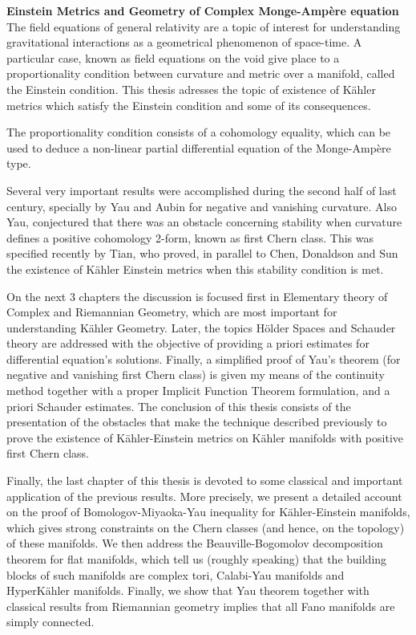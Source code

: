 \textbf{Einstein Metrics and Geometry of Complex Monge-Amp\`ere equation}\\


The field equations of general relativity are a topic of interest for understanding gravitational interactions as a geometrical phenomenon of space-time. A particular case, known as field equations on the void give place to a proportionality condition between curvature and metric over a manifold, called the Einstein condition. This thesis adresses the topic of existence of K\"ahler metrics which satisfy the Einstein condition and some of its consequences.

\vspace{2mm}

The proportionality condition consists of a cohomology equality, which can be used to deduce a
non-linear partial differential equation of the Monge-Amp\`ere type.

\vspace{2mm}

Several very important results were accomplished during the second half of last century, specially
by Yau and Aubin for negative and vanishing curvature. Also Yau, conjectured that there was an
obstacle concerning stability when curvature defines a positive cohomology 2-form, known as first
Chern class. This was specified recently by Tian, who proved, in parallel to Chen, Donaldson and
Sun the existence of K\"ahler Einstein metrics when this stability condition is met.

\vspace{2mm}

On the next 3 chapters the discussion is focused first in Elementary theory of Complex and Riemannian Geometry, which are most important for understanding K\"ahler Geometry. Later, the topics H\"older Spaces and Schauder theory are addressed with the objective of providing a priori estimates for differential equation's solutions. Finally, a simplified proof of Yau's theorem (for negative and vanishing first Chern class) is given my means of the continuity method together with a proper Implicit Function Theorem formulation, and a priori Schauder estimates. The conclusion of this thesis consists of the presentation of the obstacles that make the technique described previously to prove the existence of K\"ahler-Einstein metrics on K\"{a}hler manifolds with positive first Chern class.

\vspace{2mm}

Finally, the last chapter of this thesis is devoted to some classical and important application of the previous results. More precisely, we present a detailed account on the proof of Bomologov-Miyaoka-Yau inequality for K\"{a}hler-Einstein manifolds, which gives strong constraints on the Chern classes (and hence, on the topology) of these manifolds. We then address the Beauville-Bogomolov decomposition theorem for flat manifolds, which tell us (roughly speaking) that the building blocks of such manifolds are complex tori, Calabi-Yau manifolds and HyperK\"{a}hler manifolds. Finally, we show that Yau theorem together with classical results from Riemannian geometry implies that all Fano manifolds are simply connected.